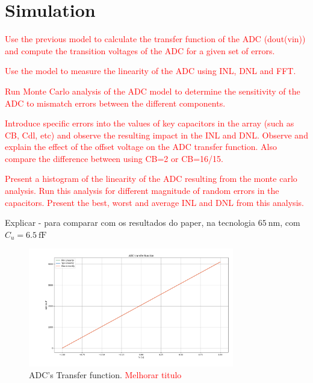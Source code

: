 \section{Simulation}

\textcolor{red}{Use the previous model to calculate the transfer function of the ADC (dout(vin))
and compute the transition voltages of the ADC for a given set of errors.}

\textcolor{red}{Use the model to measure the linearity of the ADC using INL, DNL and FFT.}

\textcolor{red}{Run Monte Carlo analysis of the ADC model to determine the sensitivity of the
ADC to mismatch errors between the different components.}

\textcolor{red}{Introduce specific errors into the values of key capacitors in the array (such as CB, Cdl, etc) and observe the resulting impact in the INL and DNL. Observe and explain the effect of the offset voltage on the ADC transfer function. Also compare the difference between using CB=2 or CB=16/15.}

\textcolor{red}{Present a histogram of the linearity of the ADC resulting from the monte carlo analysis. Run this analysis for different magnitude of random errors in the capacitors. Present the best, worst and average INL and DNL from this analysis.}


Explicar - para comparar com os resultados do paper, na tecnologia $\SI{65}{\nano\meter}$, com $C_u = \SI{6.5}{\femto\farad}$

\begin{figure}[H]

    \centering
    \includegraphics*[width=0.8\textwidth]{Images/ADC_TransFunc_All_Caps_20Ksim_s0011.png}
    \caption{ADC's Transfer function. \textcolor{red}{Melhorar titulo}}

    \label{fig:ADC_TF_ALLCAPS}
\end{figure}

